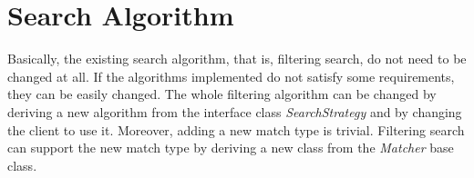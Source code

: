 \documentclass[a4paper,twoside]{tce}
\begin{document}
\section{Search Algorithm}

Basically, the existing search algorithm, that is, filtering search,
do not need to be changed at all. If the algorithms implemented do not
satisfy some requirements, they can be easily changed. The whole
filtering algorithm can be changed by deriving a new algorithm from
the interface class \emph{SearchStrategy} and by changing the client
to use it. Moreover, adding a new match type is trivial. Filtering
search can support the new match type by deriving a new class from the
\emph{Matcher} base class.



\cleardoublepage


\end{document}
